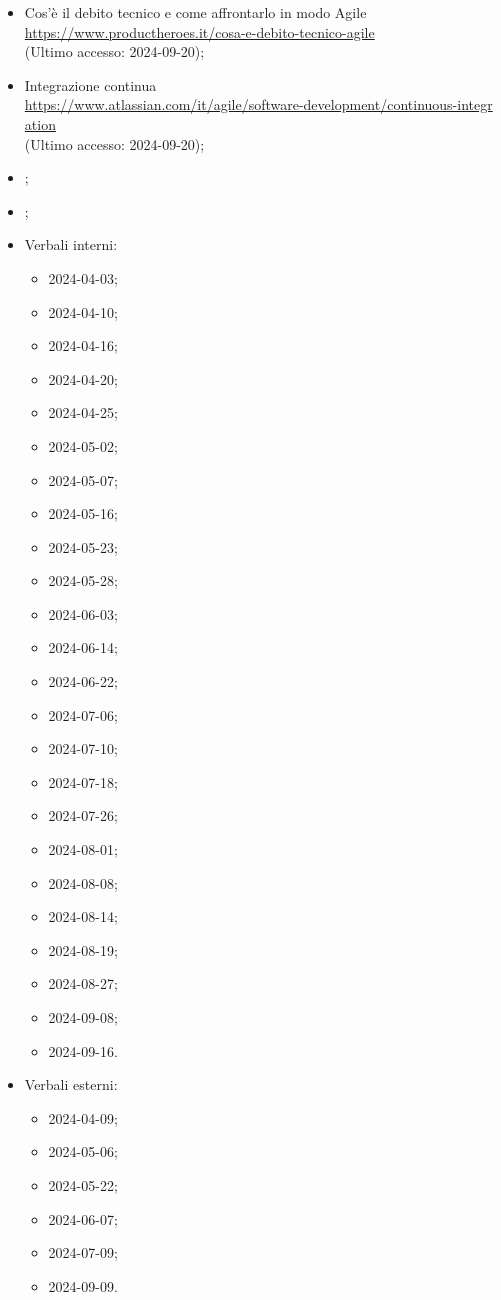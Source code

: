 \begin{itemize}
  \item Cos'è il debito tecnico e come affrontarlo in modo Agile \\ \href{https://www.productheroes.it/cosa-e-debito-tecnico-agile}{https://www.productheroes.it/cosa-e-debito-tecnico-agile}  \\ (Ultimo accesso: 2024-09-20);
  \item Integrazione continua \\ \href{https://www.atlassian.com/it/agile/software-development/continuous-integration}{https://www.atlassian.com/it/agile/software-development/continuous-integr \- ation}  \\ (Ultimo accesso: 2024-09-20);
  \item \PianoDiQualifica;
  \item \Glossario;
  \item Verbali interni:
  \begin{itemize}
    \item 2024-04-03;
    \item 2024-04-10;
    \item 2024-04-16;
    \item 2024-04-20;
    \item 2024-04-25;
    \item 2024-05-02;
    \item 2024-05-07;
    \item 2024-05-16;
    \item 2024-05-23;
    \item 2024-05-28;
    \item 2024-06-03;
    \item 2024-06-14;
    \item 2024-06-22;
    \item 2024-07-06;
    \item 2024-07-10;
    \item 2024-07-18;
    \item 2024-07-26;
    \item 2024-08-01;
    \item 2024-08-08;
    \item 2024-08-14;
    \item 2024-08-19;
    \item 2024-08-27;
    \item 2024-09-08;
    \item 2024-09-16.
  \end{itemize}
  \item Verbali esterni:
  \begin{itemize}
    \item 2024-04-09;
    \item 2024-05-06;
    \item 2024-05-22;
    \item 2024-06-07;
    \item 2024-07-09;
    \item 2024-09-09.
  \end{itemize}
\end{itemize}

